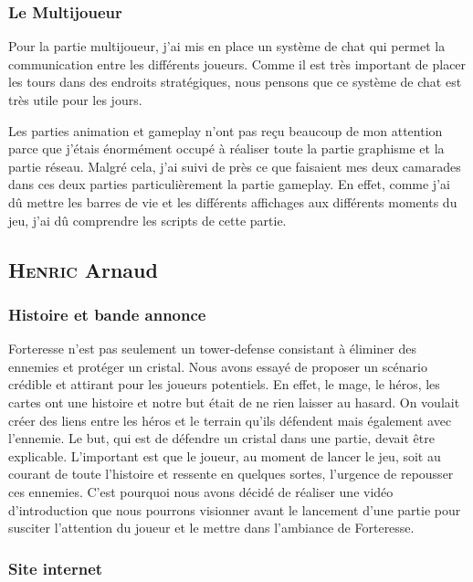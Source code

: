 \documentclass[a4paper, 12pt]{article}
\begin{document}
\subsubsection{Le Multijoueur}

Pour la partie multijoueur, j’ai mis en place un système de chat qui permet la communication entre les différents joueurs. Comme il est très important de placer les tours dans des endroits stratégiques, nous pensons que ce système de chat est très utile pour les jours.
\par Les parties animation et gameplay n’ont pas reçu beaucoup de mon attention parce que j’étais énormément occupé à réaliser toute la partie graphisme et la partie réseau. Malgré cela, j’ai suivi de près ce que faisaient mes deux camarades dans ces deux parties particulièrement la partie gameplay. En effet, comme j’ai dû mettre les barres de vie et les différents affichages aux différents moments du jeu, j’ai dû comprendre les scripts de cette partie.

	\subsection{\textsc{Henric} Arnaud}
	\subsubsection{Histoire et bande annonce}
	Forteresse n’est pas seulement un tower-defense consistant à éliminer des ennemies et protéger un cristal. Nous avons essayé de proposer un scénario crédible et attirant pour les joueurs potentiels. En effet, le mage, le héros, les cartes ont une histoire et notre but était de ne rien laisser au hasard. On voulait créer des liens entre les héros et le terrain qu’ils défendent mais également avec l’ennemie. Le but, qui est de défendre un cristal dans une partie, devait être explicable. L’important est que le joueur, au moment de lancer le jeu, soit au courant de toute l’histoire et ressente en quelques sortes, l’urgence de repousser ces ennemies. C’est pourquoi nous avons décidé de réaliser une vidéo d’introduction que nous pourrons visionner avant le lancement d’une partie pour susciter l’attention du joueur et le mettre dans l’ambiance de Forteresse.

		\subsubsection{Site internet}
\end{document}
